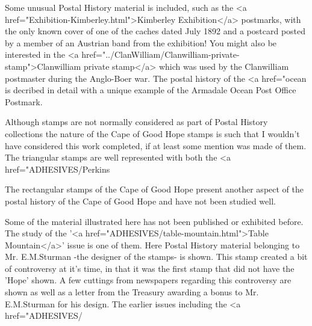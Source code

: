 Some unusual Postal History material is included, 
such as the <a href="Exhibition-Kimberley.html">Kimberley Exhibition</a>
postmarks, with the only known cover of one of the 
caches dated July 1892 and a postcard posted by a member of an 
Austrian band from the exhibition! You might also be interested in the 
<a href="../ClanWilliam/Clanwilliam-private-stamp">Clanwilliam private stamp</a> 
which was used by the Clanwilliam postmaster during the Anglo-Boer war. 
The postal history of the <a href="ocean%
is decribed in detail with a unique example of the Armadale Ocean Post Office Postmark.




            
            
Although stamps are not normally considered as part of Postal History collections the nature of the Cape of Good Hope stamps is such that I wouldn't have considered this work completed, if at least some mention was made of them. The triangular stamps are well represented with both the <a href="ADHESIVES/Perkins%

The rectangular stamps of the Cape of Good Hope present another aspect of the postal history of the Cape of Good Hope and have not been studied well. 
            
Some of the material illustrated here has not been published or exhibited before. The study of the '<a href="ADHESIVES/table-mountain.html">Table Mountain</a>' issue is one of them. Here Postal History material belonging to Mr. E.M.Sturman -the designer of the stamps- is shown. This stamp created a bit of controversy at it's time, in that it was the first stamp that did not have the 'Hope' shown. A few cuttings from newspapers regarding this controversy are shown as well as a letter from the Treasury awarding a bonus to Mr. E.M.Sturman for his design. The earlier issues including the <a href="ADHESIVES/%

